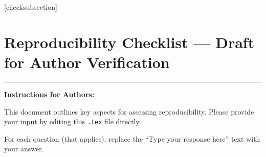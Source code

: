 \documentclass[letterpaper]{article}
\begin{document}
\fi
\setlength{\leftmargini}{20pt}
\makeatletter\def\@listi{\leftmargin\leftmargini \topsep .5em \parsep .5em \itemsep .5em}
\def\@listii{\leftmargin\leftmarginii \labelwidth\leftmarginii \advance\labelwidth-\labelsep \topsep .4em \parsep .4em \itemsep .4em}
\def\@listiii{\leftmargin\leftmarginiii \labelwidth\leftmarginiii \advance\labelwidth-\labelsep \topsep .4em \parsep .4em \itemsep .4em}\makeatother

\setcounter{secnumdepth}{0}
\renewcommand\thesubsection{\arabic{subsection}}
\renewcommand\labelenumi{\thesubsection.\arabic{enumi}}

[checksubsection]

\newcommand{\checksubsection}[1]{%
  \refstepcounter{checksubsection}%
  \paragraph{\arabic{checksubsection}. #1}%
  \setcounter{checkitem}{0}%
}

\newcommand{\checkitem}{%
  \refstepcounter{checkitem}%
  \item[\arabic{checksubsection}.\arabic{checkitem}.]%
}
\newcommand{\question}[2]{\normalcolor\checkitem #1 #2 \color{blue}}
\newcommand{\ifyespoints}[1]{\makebox[0pt][l]{\hspace{-15pt}\normalcolor #1}}

\section*{Reproducibility Checklist --- Draft for Author Verification}

\vspace{1em}
\hrule
\vspace{1em}

\textbf{Instructions for Authors:}

This document outlines key aspects for assessing reproducibility. Please provide your input by editing this \texttt{.tex} file directly.

For each question (that applies), replace the ``Type your response here'' text with your answer.
\end{document}
